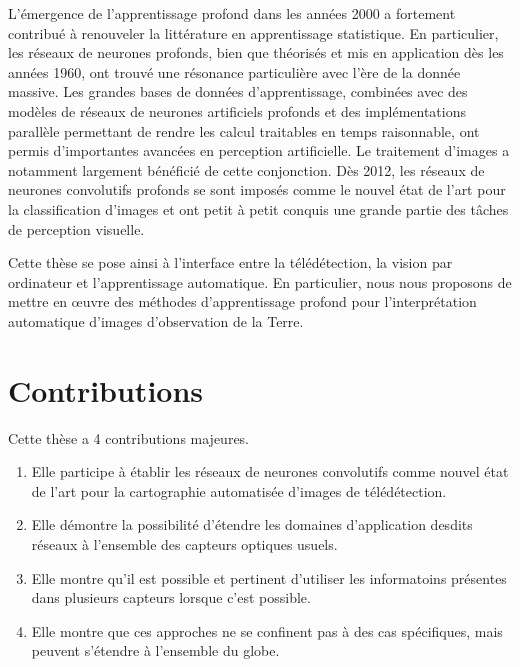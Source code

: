 L'émergence de l'apprentissage profond dans les années 2000 a fortement contribué à renouveler la littérature en apprentissage statistique. En particulier, les réseaux de neurones profonds, bien que théorisés et mis en application dès les années 1960, ont trouvé une résonance particulière avec l'ère de la donnée massive. Les grandes bases de données d'apprentissage, combinées avec des modèles de réseaux de neurones artificiels profonds et des implémentations parallèle permettant de rendre les calcul traitables en temps raisonnable, ont permis d'importantes avancées en perception artificielle. Le traitement d'images a notamment largement bénéficié de cette conjonction. Dès 2012, les réseaux de neurones convolutifs profonds se sont imposés comme le nouvel état de l'art pour la classification d'images et ont petit à petit conquis une grande partie des tâches de perception visuelle.

Cette thèse se pose ainsi à l'interface entre la télédétection, la vision par ordinateur et l'apprentissage automatique. En particulier, nous nous proposons de mettre en \oe{}uvre des méthodes d'apprentissage profond pour l'interprétation automatique d'images d'observation de la Terre.


\section{Contributions}

Cette thèse a 4 contributions majeures.
\begin{enumerate}
  \item Elle participe à établir les réseaux de neurones convolutifs comme nouvel état de l'art pour la cartographie automatisée d'images de télédétection.
  \item Elle démontre la possibilité d'étendre les domaines d'application desdits réseaux à l'ensemble des capteurs optiques usuels.
  \item Elle montre qu'il est possible et pertinent d'utiliser les informatoins présentes dans plusieurs capteurs lorsque c'est possible.
  \item Elle montre que ces approches ne se confinent pas à des cas spécifiques, mais peuvent s'étendre à l'ensemble du globe.
\end{enumerate}



